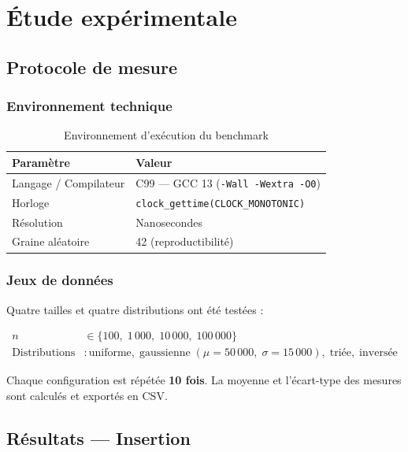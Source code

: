 \documentclass[12pt,a4paper]{report}
\begin{document}
\chapter{Étude expérimentale}
\label{chap:experimental}

\section{Protocole de mesure}

\subsection{Environnement technique}

\begin{table}[H]
\centering
\caption{Environnement d'exécution du benchmark}
\label{tab:env}
\begin{tabular}{ll}
\toprule
\textbf{Paramètre} & \textbf{Valeur} \\
\midrule
Langage / Compilateur & C99 — GCC 13 (\texttt{-Wall -Wextra -O0}) \\
Horloge               & \texttt{clock\_gettime(CLOCK\_MONOTONIC)} \\
Résolution            & Nanosecondes \\
Graine aléatoire      & 42 (reproductibilité) \\
\bottomrule
\end{tabular}
\end{table}

\subsection{Jeux de données}

Quatre tailles et quatre distributions ont été testées :

\begin{align*}
n &\in \{100,\; 1\,000,\; 10\,000,\; 100\,000\} \\
\text{Distributions} &: \text{uniforme},\; \text{gaussienne}\;(\mu{=}50\,000,\;\sigma{=}15\,000),\; \text{triée},\; \text{inversée}
\end{align*}

Chaque configuration est répétée \textbf{10 fois}. La moyenne et l'écart-type des mesures sont calculés et exportés en CSV.

\section{Résultats — Insertion}
\end{document}
